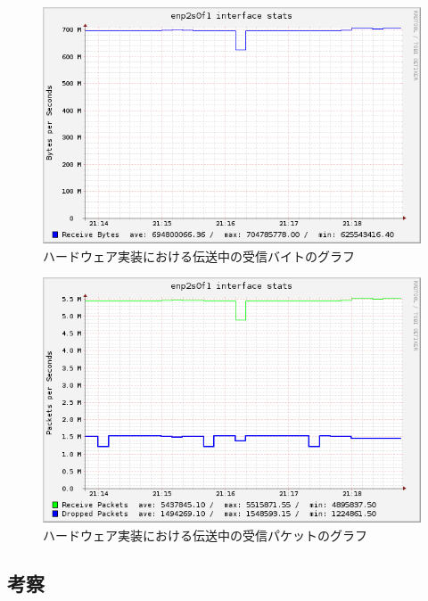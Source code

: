 \begin{figure}[htbp]
  \begin{center}
    \includegraphics[bb=0 0 597 374,width=11.8cm]{img/enp2s0f1-bytes-graph.png}
  \end{center}
  \caption{ハードウェア実装における伝送中の受信バイトのグラフ}
  \label{fig:enp2s0f1-bytes-graph}
\end{figure}

\begin{figure}[htbp]
  \begin{center}
    \includegraphics[bb=0 0 597 388,width=11.8cm]{img/enp2s0f1-packets-graph.png}
  \end{center}
  \caption{ハードウェア実装における伝送中の受信パケットのグラフ}
  \label{fig:enp2s0f1-packets-graph}
\end{figure}

\newpage

\subsection{考察}

